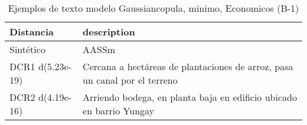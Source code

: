 \begin{table}[H]
\centering
\fontsize{10}{14}\selectfont
\caption{Ejemplos de texto modelo Gaussiancopula, minimo, Economicos (B-1)}
\label{table-example-economicos-b-1-gaussiancopula-min-text}
\begin{tabular}{|l|m{35em}|}
\hline
\rowcolor[gray]{0.8}
Distancia & description \\
\hline Sintético & AASSm \\
\hline DCR1 d(5.23e-19) & Cercana a hect\'areas  de plantaciones de arroz, pasa un canal por el terreno \\
\hline DCR2 d(4.19e-16) & Arriendo bodega, en planta baja en edificio ubicado en barrio Yungay \\
\hline
\end{tabular}
\end{table}
